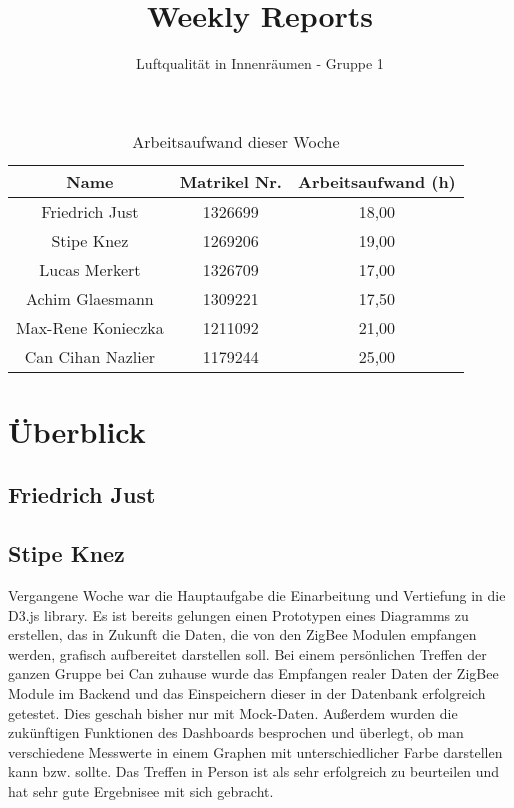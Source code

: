 \documentclass[]{article}
\title{Weekly Reports}
\author{Luftqualität in Innenräumen - Gruppe 1}
\begin{document}
\maketitle

\begin{table}[h!]
	\centering
	\begin{tabular}{|c|c|c|}
		\hline
		{\textbf{Name}}				&		{\textbf{Matrikel Nr.}} & {\textbf{Arbeitsaufwand (h)}} \\
		\hline
		Friedrich Just				&		1326699 				&		18,00\\
		\hline
		Stipe Knez					&		1269206 				&	19,00	\\
		\hline
		Lucas Merkert				&		1326709					&	17,00	\\
		\hline
		Achim Glaesmann				&		1309221					&	17,50	\\
		\hline
		Max-Rene Konieczka			&		1211092					&	21,00	\\
		\hline
		Can Cihan Nazlier			&		1179244					&	25,00	\\
		\hline
	\end{tabular}
	\caption{Arbeitsaufwand dieser Woche}
	\label{tab:worakload}
\end{table}



\section{Überblick}


\subsection{Friedrich Just}







\subsection{Stipe Knez}
Vergangene Woche war die Hauptaufgabe die Einarbeitung und Vertiefung in die D3.js library. Es ist bereits gelungen einen Prototypen eines Diagramms zu erstellen, das in Zukunft die Daten, die von den ZigBee Modulen empfangen werden, grafisch aufbereitet darstellen soll.
Bei einem persönlichen Treffen der ganzen Gruppe bei Can zuhause wurde das Empfangen realer Daten der ZigBee Module im Backend und das Einspeichern dieser in der Datenbank erfolgreich getestet. Dies geschah bisher nur mit Mock-Daten. Außerdem wurden die zukünftigen Funktionen des Dashboards besprochen und überlegt, ob man verschiedene Messwerte in einem Graphen mit unterschiedlicher Farbe darstellen kann bzw. sollte. Das Treffen in Person ist als sehr erfolgreich zu beurteilen und hat sehr gute Ergebnisee mit sich gebracht.
\end{document}
